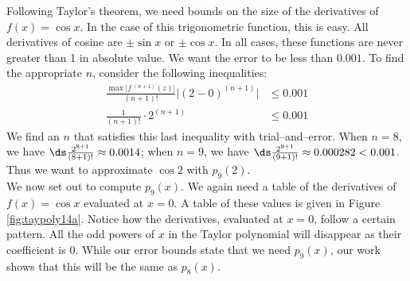 {Following Taylor's theorem, we need bounds on the size of the derivatives of $f(x)=\cos x$. In the case of this trigonometric function, this is easy. All derivatives of cosine are $\pm \sin x$ or $\pm \cos x$. In all cases, these functions are never greater than 1 in absolute value. We want the error to be less than $0.001$. To find the appropriate $n$, consider the following inequalities:
\begin{align*}
\frac{\max\big|f\,^{(n+1)}(z)\big|}{(n+1)!}\big|(2-0)^{(n+1)}\big| &\leq 0.001 \\
\frac1{(n+1)!}\cdot2^{(n+1)} &\leq 0.001
\end{align*}
We find an $n$ that satisfies this last inequality with trial--and--error. When $n=8$, we have $\ds \frac{2^{8+1}}{(8+1)!} \approx 0.0014$; when $n=9$, we have $\ds \frac{2^{9+1}}{(9+1)!} \approx 0.000282 <0.001$. Thus we want to approximate $\cos 2$ with $p_9(2)$.\\

We now set out to compute $p_9(x)$. We again need a table of the derivatives of $f(x)=\cos x$ evaluated at $x=0$. A table of these values is given in Figure \ref{fig:taypoly14a}.
Notice how the derivatives, evaluated at $x=0$, follow a certain pattern. All the odd powers of $x$ in the Taylor polynomial will disappear as their coefficient is 0. While our error bounds state that we need $p_9(x)$, our work shows that this will be the same as $p_8(x)$. 

}
